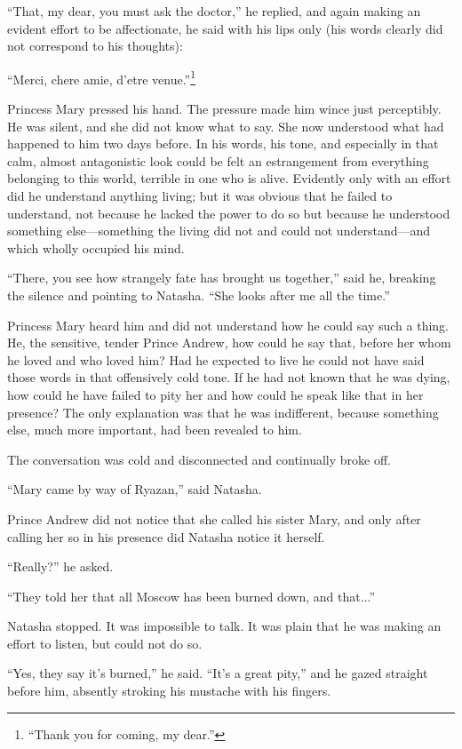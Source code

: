 ``That, my dear, you must ask the doctor,'' he replied, and again
making an evident effort to be affectionate, he said with his
lips only (his words clearly did not correspond to his thoughts):

``Merci, chere amie, d'etre venue.''\footnote{``Thank you for
  coming, my dear.''}

Princess Mary pressed his hand. The pressure made him wince just
perceptibly. He was silent, and she did not know what to say. She
now understood what had happened to him two days before. In his
words, his tone, and especially in that calm, almost antagonistic
look could be felt an estrangement from everything belonging to
this world, terrible in one who is alive. Evidently only with an
effort did he understand anything living; but it was obvious that
he failed to understand, not because he lacked the power to do so
but because he understood something else---something the living
did not and could not understand---and which wholly occupied his
mind.

``There, you see how strangely fate has brought us together,''
said he, breaking the silence and pointing to Natasha. ``She
looks after me all the time.''

Princess Mary heard him and did not understand how he could say
such a thing. He, the sensitive, tender Prince Andrew, how could
he say that, before her whom he loved and who loved him? Had he
expected to live he could not have said those words in that
offensively cold tone. If he had not known that he was dying, how
could he have failed to pity her and how could he speak like that
in her presence? The only explanation was that he was
indifferent, because something else, much more important, had
been revealed to him.

The conversation was cold and disconnected and continually broke
off.

``Mary came by way of Ryazan,'' said Natasha.

Prince Andrew did not notice that she called his sister Mary, and
only after calling her so in his presence did Natasha notice it
herself.

``Really?'' he asked.

``They told her that all Moscow has been burned down, and
that...''

Natasha stopped. It was impossible to talk. It was plain that he
was making an effort to listen, but could not do so.

``Yes, they say it's burned,'' he said. ``It's a great pity,''
and he gazed straight before him, absently stroking his mustache
with his fingers.

